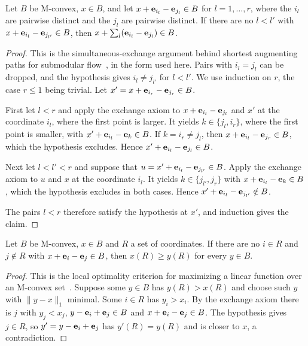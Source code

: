 \begin{lemma}\label{lem:exchange}
Let $B$ be M-convex, $x\in B$, and let $x+\mathbf{e}_{i_l}-\mathbf{e}_{j_l}\in B$ for $l=1,\dots,r$, where the $i_l$ are pairwise distinct and the $j_l$ are pairwise distinct. If there are no $l<l'$ with $x+\mathbf{e}_{i_l}-\mathbf{e}_{j_{l'}}\in B$, then $x+\sum_l(\mathbf{e}_{i_l}-\mathbf{e}_{j_l})\in B$.
\end{lemma}

\begin{proof}
This is the simultaneous-exchange argument behind shortest augmenting paths for submodular flow~\cite{cunningham1985,fujishige2005,murota2003}, in the form used here. Pairs with $i_l=j_l$ can be dropped, and the hypothesis gives $i_l\ne j_{l'}$ for $l<l'$. We use induction on $r$, the case $r\le1$ being trivial. Let $x'=x+\mathbf{e}_{i_r}-\mathbf{e}_{j_r}\in B$.

First let $l<r$ and apply the exchange axiom to $x+\mathbf{e}_{i_l}-\mathbf{e}_{j_l}$ and $x'$ at the coordinate $i_l$, where the first point is larger. It yields $k\in\{j_l,i_r\}$, where the first point is smaller, with $x'+\mathbf{e}_{i_l}-\mathbf{e}_k\in B$. If $k=i_r\ne j_l$, then $x+\mathbf{e}_{i_l}-\mathbf{e}_{j_r}\in B$, which the hypothesis excludes. Hence $x'+\mathbf{e}_{i_l}-\mathbf{e}_{j_l}\in B$.

Next let $l<l'<r$ and suppose that $u=x'+\mathbf{e}_{i_l}-\mathbf{e}_{j_{l'}}\in B$. Apply the exchange axiom to $u$ and $x$ at the coordinate $i_l$. It yields $k\in\{j_{l'},j_r\}$ with $x+\mathbf{e}_{i_l}-\mathbf{e}_k\in B$, which the hypothesis excludes in both cases. Hence $x'+\mathbf{e}_{i_l}-\mathbf{e}_{j_{l'}}\notin B$.

The pairs $l<r$ therefore satisfy the hypothesis at $x'$, and induction gives the claim.
\end{proof}

\begin{lemma}\label{lem:localmax}
Let $B$ be M-convex, $x\in B$ and $R$ a set of coordinates. If there are no $i\in R$ and $j\notin R$ with $x+\mathbf{e}_i-\mathbf{e}_j\in B$, then $x(R)\ge y(R)$ for every $y\in B$.
\end{lemma}

\begin{proof}
This is the local optimality criterion for maximizing a linear function over an M-convex set~\cite{murota2003}. Suppose some $y\in B$ has $y(R)>x(R)$ and choose such $y$ with $\lVert y-x\rVert_1$ minimal. Some $i\in R$ has $y_i>x_i$. By the exchange axiom there is $j$ with $y_j<x_j$, $y-\mathbf{e}_i+\mathbf{e}_j\in B$ and $x+\mathbf{e}_i-\mathbf{e}_j\in B$. The hypothesis gives $j\in R$, so $y'=y-\mathbf{e}_i+\mathbf{e}_j$ has $y'(R)=y(R)$ and is closer to $x$, a contradiction.
\end{proof}

